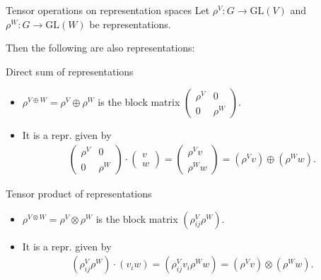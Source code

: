 \documentclass[handout, 10pt]{beamer}
\newcommand{\GL}{\text{GL}}
\begin{document}
	\begin{frame}{Tensor operations on representation spaces}
		Let $\rho^V: G \rightarrow \GL(V)$ and $\rho^W: G \rightarrow \GL(W)$ be representations. 
		
		
		Then the following are also representations:
		\vfill
		\begin{exampleblock}{Direct sum of representations}
			\begin{itemize}
				\item $\rho^{V \oplus W} = \rho^V \oplus \rho^W$ is the block matrix $\begin{pmatrix}
					\rho^V & 0 \\ 0 & \rho^W
				\end{pmatrix}$.
				
				\item It is a repr. given by 
				\begin{align*}
					\begin{pmatrix}
						\rho^V & 0 \\ 0 & \rho^W
					\end{pmatrix} \cdot \begin{pmatrix}
						v \\ w
					\end{pmatrix} 
					= \begin{pmatrix}
						\rho^V  v \\ \rho^W  w
					\end{pmatrix} 
					= (\rho^V v) \oplus (\rho^W w).
				\end{align*}
			\end{itemize}
		\end{exampleblock}
		
		\begin{exampleblock}{Tensor product of representations}
			\begin{itemize}
				\item $\rho^{V \otimes W} = \rho^V \otimes \rho^W$ is the block matrix $(\rho^V_{ij} \rho^W)$.
				
				\item It is a repr. given by 
				\begin{align*}
				(\rho^V_{ij} \rho^W) \cdot (v_i w)
					= (\rho^V_{ij}v_i \rho^Ww)
					= (\rho^V v) \otimes (\rho^W w).
				\end{align*}
			\end{itemize}
		\end{exampleblock}
	\end{frame}
	
\end{document}
